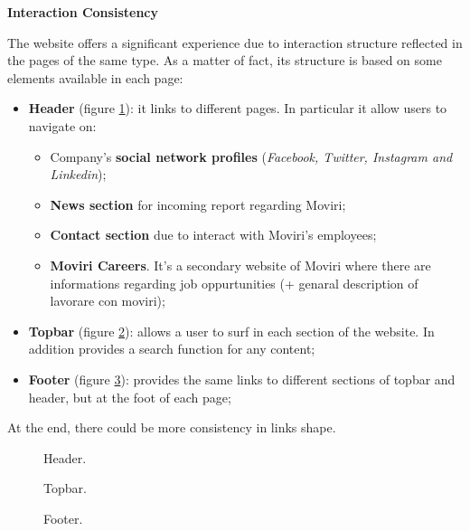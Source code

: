 \textbf{Interaction Consistency}\par
The website offers a significant experience due to interaction structure reflected in the pages of the same type. As a matter of fact, its structure is based on some elements available in each page: 
\begin{itemize}
\item \textbf{Header} (figure \ref{Header}): it links to different pages. In particular it allow users to navigate on:
\begin{itemize}
\item Company's \textbf{social network profiles} (\textit{Facebook, Twitter, Instagram and Linkedin});
\item \textbf{News section} for incoming report regarding Moviri;
\item \textbf{Contact section} due to interact with Moviri's employees;
\item \textbf{Moviri Careers}. It's a secondary website of Moviri where there are informations regarding job oppurtunities (+ genaral description of lavorare con moviri);
\end{itemize}
\item \textbf{Topbar} (figure \ref{topbar}): allows a user to surf in each section of the website. In addition provides a search function for any content; 
\item \textbf{Footer} (figure \ref{Footer}): provides the same links to different sections of topbar and header, but at the foot of each page;
\end{itemize}
At the end, there could be more consistency in links shape.	


\begin{figure}[H]
  \centering
  \caption{Header.}
   \label{Header}
\end{figure}

\begin{figure}[H]
  \centering
  \caption{Topbar.}
   \label{topbar}
\end{figure}

\begin{figure}[H]
  \centering
  \caption{Footer.}
   \label{Footer}
\end{figure}
\medskip

